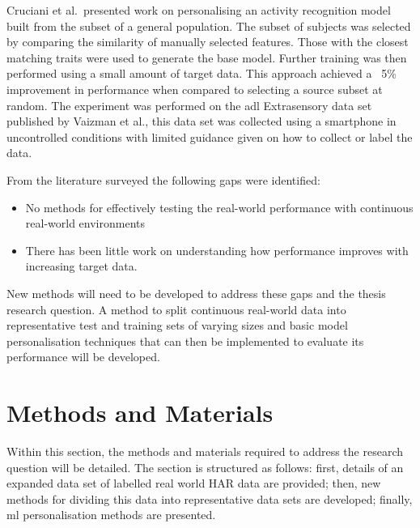 Cruciani et al.~presented work on personalising an activity recognition model built from the subset of a general population. The subset of subjects was selected by comparing the similarity of manually selected features. Those with the closest matching traits were used to generate the base model. Further training was then performed using a small amount of target data. This approach achieved a ~5\% improvement in performance when compared to selecting a source subset at random\cite{Cruciani2020}. The experiment was performed on the \acrshort{adl} Extrasensory data set published by Vaizman et al.\cite{Vaizman2017}, this data set was collected using a smartphone in uncontrolled conditions with limited guidance given on how to collect or label the data.

From the literature surveyed the following gaps were identified:
\begin{itemize}
\item No methods for effectively testing the real-world performance with continuous real-world environments
\item There has been little work on understanding how performance improves with increasing target data.
\end{itemize}

New methods will need to be developed to address these gaps and the thesis research question. A method to split continuous real-world data into representative test and training sets of varying sizes and basic model personalisation techniques that can then be implemented to evaluate its performance will be developed.

\section{Methods and Materials}
\label{sec:personalistaion-methods}
Within this section, the methods and materials required to address the research question will be detailed. The section is structured as follows: first, details of an expanded data set of labelled real world HAR data are provided; then, new methods for dividing this data into representative data sets are developed; finally, \acrshort{ml} personalisation methods are presented.

